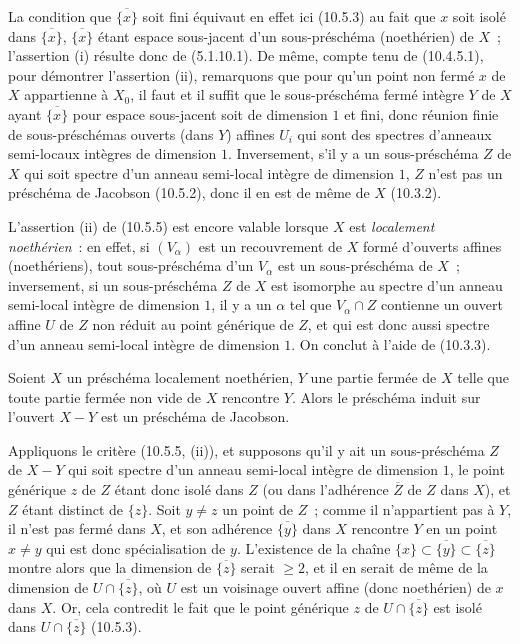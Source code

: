 La condition que $\overline{\{x\}}$ soit fini équivaut en effet ici (10.5.3)
au fait que $x$ soit isolé dans $\overline{\{x\}}$, $\overline{\{x\}}$ étant
espace sous-jacent d'un sous-préschéma (noethérien) de $X$~; l'assertion (i)
résulte donc de (5.1.10.1). De même, compte tenu de (10.4.5.1), pour démontrer
l'assertion (ii), remarquons que pour qu'un point non fermé $x$ de $X$
appartienne à $X_0$, il faut et il suffit que le sous-préschéma fermé intègre
$Y$ de $X$ ayant $\overline{\{x\}}$ pour espace sous-jacent soit de dimension
$1$ et fini, donc réunion finie de sous-préschémas ouverts (dans $Y$) affines
$U_i$ qui sont des spectres d'anneaux semi-locaux intègres de dimension $1$.
Inversement, s'il y a un sous-préschéma $Z$ de $X$ qui soit spectre d'un anneau
semi-local intègre de dimension $1$, $Z$ n'est pas un préschéma de Jacobson
(10.5.2), donc il en est de même de $X$ (10.3.2).

\begin{remark}[10.5.6]
\label{IV.10.5.6-fr}
L'assertion (ii) de (10.5.5) est encore valable lorsque $X$ est
\emph{localement noethérien}~: en effet, si $(V_\alpha)$ est un recouvrement de
$X$ formé d'ouverts affines (noethériens), tout sous-préschéma d'un $V_\alpha$
est un sous-préschéma de $X$~; inversement, si un sous-préschéma $Z$ de $X$ est
isomorphe au spectre d'un anneau semi-local intègre de dimension $1$, il y a
un $\alpha$ tel que $V_\alpha\cap Z$ contienne un ouvert affine $U$ de $Z$ non
réduit au point générique de $Z$, et qui est donc aussi spectre d'un anneau
semi-local intègre de dimension $1$. On conclut à l'aide de (10.3.3).
\end{remark}

\begin{proposition}[10.5.7]
\label{IV.10.5.7-fr}
Soient $X$ un préschéma localement noethérien, $Y$ une partie fermée de $X$
telle que toute partie fermée non vide de $X$ rencontre $Y$. Alors le
préschéma induit sur l'ouvert $X-Y$ est un préschéma de Jacobson.
\end{proposition}

Appliquons le critère (10.5.5, (ii)), et supposons qu'il y ait un
sous-préschéma $Z$ de $X-Y$ qui soit spectre d'un anneau semi-local intègre de
dimension $1$, le point générique $z$ de $Z$ étant donc isolé dans $Z$ (ou
dans l'adhérence $\overline Z$ de $Z$ dans $X$), et $Z$ étant distinct de
$\{z\}$. Soit $y\neq z$ un point de $Z$~; comme il n'appartient pas à $Y$, il
n'est pas fermé dans $X$, et son adhérence $\overline{\{y\}}$ dans $X$
rencontre $Y$ en un point $x\neq y$ qui est donc spécialisation de $y$.
L'existence de la chaîne
$\{x\}\subset\overline{\{y\}}\subset\overline{\{z\}}$ montre alors que la
dimension de $\overline{\{z\}}$ serait $\geq2$, et il en serait de même de la
dimension de $U\cap\overline{\{z\}}$, où $U$ est un voisinage ouvert affine
(donc noethérien) de $x$ dans $X$. Or, cela contredit le fait que le point
générique $z$ de $U\cap\overline{\{z\}}$ est isolé dans
$U\cap\overline{\{z\}}$ (10.5.3).

